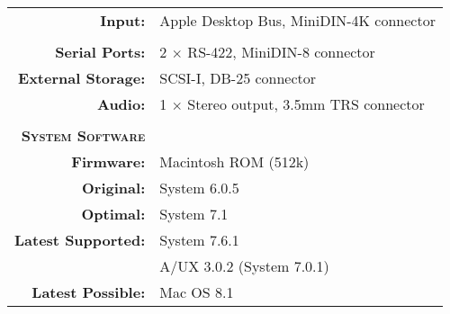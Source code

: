 \begin{tabular}{ r p{6in} }
\\
\textbf{Input:} & Apple Desktop Bus, MiniDIN-4K connector \\
\\
\textbf{Serial Ports:} & 2 \(\times\) RS-422, MiniDIN-8 connector \\
\textbf{External Storage:} & SCSI-I, DB-25 connector \\
\textbf{Audio:} & 1 \(\times\) Stereo output, 3.5mm TRS connector \\
\\
\textbf{\textsc{System Software}} & ~ \\
\textbf{Firmware:} & Macintosh ROM (512k) \\
\textbf{Original:} & System 6.0.5 \\
\textbf{Optimal:} & System 7.1 \\
\textbf{Latest Supported:} & System 7.6.1 \\
~ & A/UX 3.0.2 (System 7.0.1) \\
\textbf{Latest Possible:} & Mac OS 8.1 \\
\end{tabular}
